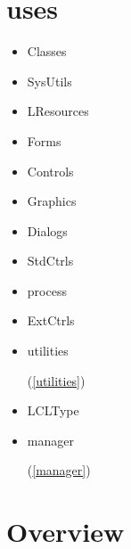 \documentclass{report}
\begin{document}
\section{uses}
\begin{itemize}
\item \begin{ttfamily}Classes\end{ttfamily}\item \begin{ttfamily}SysUtils\end{ttfamily}\item \begin{ttfamily}LResources\end{ttfamily}\item \begin{ttfamily}Forms\end{ttfamily}\item \begin{ttfamily}Controls\end{ttfamily}\item \begin{ttfamily}Graphics\end{ttfamily}\item \begin{ttfamily}Dialogs\end{ttfamily}\item \begin{ttfamily}StdCtrls\end{ttfamily}\item \begin{ttfamily}process\end{ttfamily}\item \begin{ttfamily}ExtCtrls\end{ttfamily}\item \begin{ttfamily}utilities\end{ttfamily}(\ref{utilities})\item \begin{ttfamily}LCLType\end{ttfamily}\item \begin{ttfamily}manager\end{ttfamily}(\ref{manager})\end{itemize}
\section{Overview}
\begin{description}
\item[\texttt{\begin{ttfamily}TConvDisp\end{ttfamily} Class}]
\end{description}
\end{document}
